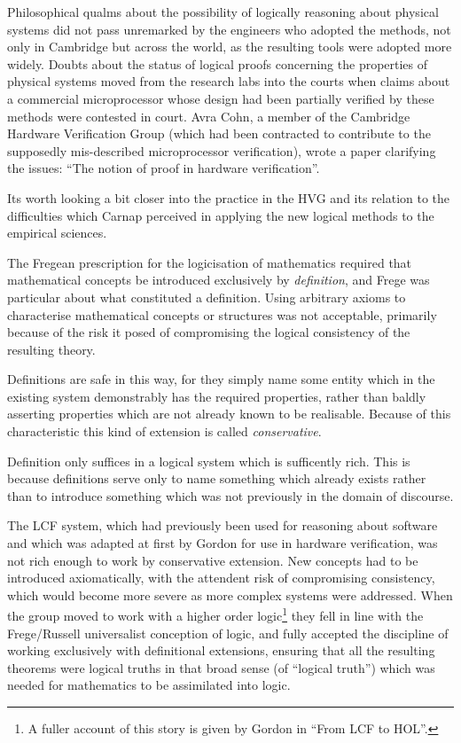 \documentclass[10pt,titlepage]{book}
\begin{document}
Philosophical qualms about the possibility of logically reasoning about physical systems did not pass unremarked by the engineers who adopted the methods, not only in Cambridge but across the world, as the resulting tools were adopted more widely.
Doubts about the status of logical proofs concerning the properties of physical systems moved from the research labs into the courts when claims about a commercial microprocessor whose design had been partially verified by these methods were contested in court.
Avra Cohn, a member of the Cambridge Hardware Verification Group (which had been contracted to contribute to the supposedly mis-described microprocessor verification), wrote a paper clarifying the issues: ``The notion of proof in hardware verification''\cite{cohnPIHV}.

Its worth looking a bit closer into the practice in the HVG and its relation to the difficulties which Carnap perceived in applying the new logical methods to the empirical sciences.

The Fregean prescription for the logicisation of mathematics required that mathematical concepts be introduced exclusively by \emph{definition}, and Frege was particular about what constituted a definition.
Using arbitrary axioms to characterise mathematical concepts or structures was not acceptable, primarily because of the risk it posed of compromising the logical consistency of the resulting theory.

Definitions are safe in this way, for they simply name some entity which in the existing system demonstrably has the required properties, rather than baldly asserting properties which are not already known to be realisable.
Because of this characteristic this kind of extension is called \emph{conservative}.

Definition only suffices in a logical system which is sufficently rich.
This is because definitions serve only to name something which already exists rather than to introduce something which was not previously in the domain of discourse.

The LCF system, which had previously been used for reasoning about software and which was adapted at first by Gordon for use in hardware verification, was not rich enough to work by conservative extension.
New concepts had to be introduced axiomatically, with the attendent risk of compromising consistency, which would become more severe as more complex systems were addressed.
When the group moved to work with a higher order logic\footnote{A fuller account of this story is given by Gordon in ``From LCF to HOL''\cite{gordon2000lcf}.} they fell in line with the Frege/Russell universalist conception of logic, and fully accepted the discipline of working exclusively with definitional  extensions, ensuring that all the resulting theorems were logical truths in that broad sense (of ``logical truth'') which was needed for mathematics to be assimilated into logic.
\end{document}
